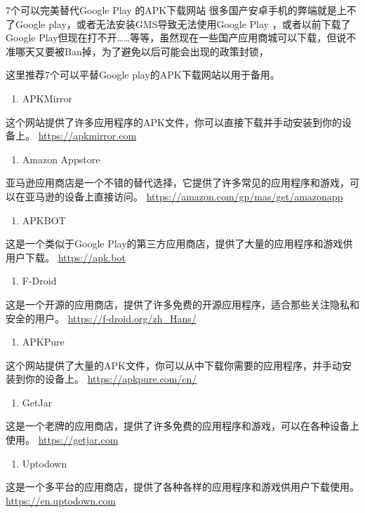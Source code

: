 \documentclass[11pt]{article}
\date{\today}
\title{}
\begin{document}
\tableofcontents

7个可以完美替代Google Play 的APK下载网站️
很多国产安卓手机的弊端就是上不了Google play，或者无法安装GMS导致无法使用Google Play ，或者以前下载了Google Play但现在打不开……等等，虽然现在一些国产应用商城可以下载，但说不准哪天又要被Ban掉，为了避免以后可能会出现的政策封锁，

这里推荐7个可以平替Google play的APK下载网站以用于备用。

\begin{enumerate}
\item APKMirror
\end{enumerate}
这个网站提供了许多应用程序的APK文件，你可以直接下载并手动安装到你的设备上。
\url{https://apkmirror.com}

\begin{enumerate}
\item Amazon Appstore
\end{enumerate}
亚马逊应用商店是一个不错的替代选择，它提供了许多常见的应用程序和游戏，可以在亚马逊的设备上直接访问。
\url{https://amazon.com/gp/mas/get/amazonapp}

\begin{enumerate}
\item APKBOT
\end{enumerate}
这是一个类似于Google Play的第三方应用商店，提供了大量的应用程序和游戏供用户下载。
\url{https://apk.bot}

\begin{enumerate}
\item F-Droid
\end{enumerate}
这是一个开源的应用商店，提供了许多免费的开源应用程序，适合那些关注隐私和安全的用户。
\url{https://f-droid.org/zh\_Hans/}

\begin{enumerate}
\item APKPure
\end{enumerate}
这个网站提供了大量的APK文件，你可以从中下载你需要的应用程序，并手动安装到你的设备上。
\url{https://apkpure.com/cn/}

\begin{enumerate}
\item GetJar
\end{enumerate}
这是一个老牌的应用商店，提供了许多免费的应用程序和游戏，可以在各种设备上使用。
\url{https://getjar.com}

\begin{enumerate}
\item Uptodown
\end{enumerate}
这是一个多平台的应用商店，提供了各种各样的应用程序和游戏供用户下载使用。
\url{https://en.uptodown.com}
\end{document}
